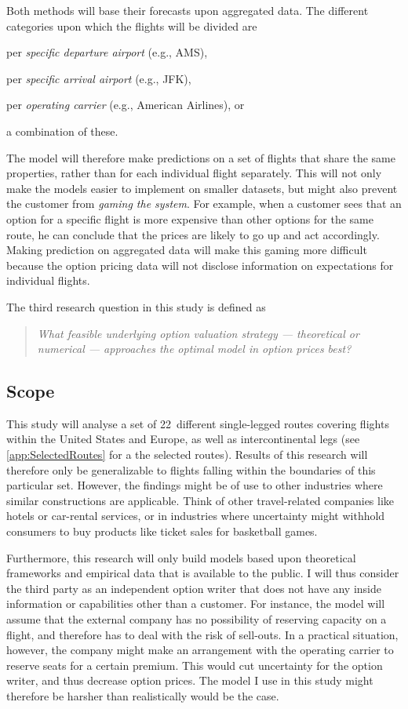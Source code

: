 Both methods will base their forecasts upon aggregated data. The different categories upon which the flights will be divided are \begin{inparaenum}
\item per \emph{specific departure airport} (e.g., AMS),
\item per \emph{specific arrival airport} (e.g., JFK),
\item per \emph{operating carrier} (e.g., American Airlines), or
\item a combination of these.
\end{inparaenum} The model will therefore make predictions on a set of flights that share the same properties, rather than for each individual flight separately. This will not only make the models easier to implement on smaller datasets, but might also prevent the customer from \textit{gaming the system}. For example, when a customer sees that an option for a specific flight is more expensive than other options for the same route, he can conclude that the prices are likely to go up and act accordingly. Making prediction on aggregated data will make this gaming more difficult because the option pricing data will not disclose information on expectations for individual flights.

\noindent
The third research question in this study is defined as

\begin{quote}\emph{What feasible underlying option valuation strategy --- theoretical or numerical --- approaches the optimal model in option prices best?}\end{quote}

\subsection{Scope}
This study will analyse a set of 22~different single-legged routes covering flights within the United States and Europe, as well as intercontinental legs (see \cref{app:SelectedRoutes} for a the selected routes). Results of this research will therefore only be generalizable to flights falling within the boundaries of this particular set. However, the findings might be of use to other industries where similar constructions are applicable. Think of other travel-related companies like hotels or car-rental services, or in industries where uncertainty might withhold consumers to buy products like ticket sales for basketball games.

Furthermore, this research will only build models based upon theoretical frameworks and empirical data that is available to the public. I will thus consider the third party as an independent option writer that does not have any inside information or capabilities other than a customer. For instance, the model will assume that the external company has no possibility of reserving capacity on a flight, and therefore has to deal with the risk of sell-outs. In a practical situation, however, the company might make an arrangement with the operating carrier to reserve seats for a certain premium. This would cut uncertainty for the option writer, and thus decrease option prices. The model I use in this study might therefore be harsher than realistically would be the case.
